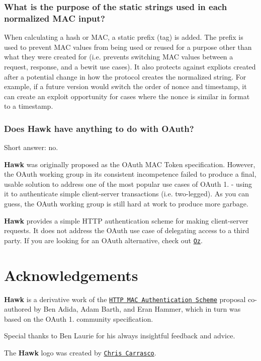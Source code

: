 \subsubsection*{What is the purpose of the static strings used in each normalized M\+A\+C input?}

When calculating a hash or M\+A\+C, a static prefix (tag) is added. The prefix is used to prevent M\+A\+C values from being used or reused for a purpose other than what they were created for (i.\+e. prevents switching M\+A\+C values between a request, response, and a bewit use cases). It also protects against expliots created after a potential change in how the protocol creates the normalized string. For example, if a future version would switch the order of nonce and timestamp, it can create an exploit opportunity for cases where the nonce is similar in format to a timestamp.

\subsubsection*{Does {\bfseries Hawk} have anything to do with O\+Auth?}

Short answer\+: no.

{\bfseries Hawk} was originally proposed as the O\+Auth M\+A\+C Token specification. However, the O\+Auth working group in its consistent incompetence failed to produce a final, usable solution to address one of the most popular use cases of O\+Auth 1. -\/ using it to authenticate simple client-\/server transactions (i.\+e. two-\/legged). As you can guess, the O\+Auth working group is still hard at work to produce more garbage.

{\bfseries Hawk} provides a simple H\+T\+T\+P authentication scheme for making client-\/server requests. It does not address the O\+Auth use case of delegating access to a third party. If you are looking for an O\+Auth alternative, check out \href{https://github.com/hueniverse/oz}{\tt Oz}.

\section*{Acknowledgements}

{\bfseries Hawk} is a derivative work of the \href{http://tools.ietf.org/html/draft-hammer-oauth-v2-mac-token-05}{\tt H\+T\+T\+P M\+A\+C Authentication Scheme} proposal co-\/authored by Ben Adida, Adam Barth, and Eran Hammer, which in turn was based on the O\+Auth 1. community specification.

Special thanks to Ben Laurie for his always insightful feedback and advice.

The {\bfseries Hawk} logo was created by \href{http://chriscarrasco.com}{\tt Chris Carrasco}. 